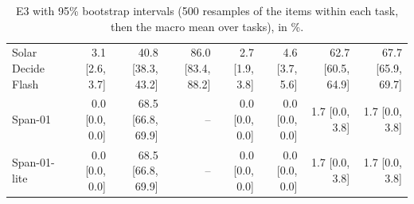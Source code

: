 \begin{table}[t]
\begin{tabular}{@{}lrrrrrrr@{}}
Solar Decide Flash & 3.1 [2.6, 3.7] & 40.8 [38.3, 43.2] & 86.0 [83.4, 88.2] & 2.7 [1.9, 3.8] & 4.6 [3.7, 5.6] & 62.7 [60.5, 64.9] & 67.7 [65.9, 69.7] \\
Span-01 & 0.0 [0.0, 0.0] & 68.5 [66.8, 69.9] & -- & 0.0 [0.0, 0.0] & 0.0 [0.0, 0.0] & 1.7 [0.0, 3.8] & 1.7 [0.0, 3.8] \\
Span-01-lite & 0.0 [0.0, 0.0] & 68.5 [66.8, 69.9] & -- & 0.0 [0.0, 0.0] & 0.0 [0.0, 0.0] & 1.7 [0.0, 3.8] & 1.7 [0.0, 3.8] \\
\bottomrule
\end{tabular}
\caption{E3 with 95\% bootstrap intervals (500 resamples of the items within each task, then the macro mean over tasks), in \%.}
\label{tab:app-e3-ci}
\end{table}

